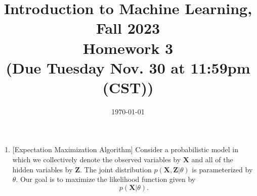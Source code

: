 \documentclass[10pt]{article}
\begin{document}
\date{\today}
\title{Introduction to Machine Learning, Fall 2023 \\
	Homework 3\\
	\small (Due Tuesday Nov. 30 at 11:59pm (CST))}
\maketitle

\begin{enumerate}[1.]


	\item {} [Expectation Maximization Algorithm]
            Consider a probabilistic model in which we collectively denote the observed variables by $\boldsymbol{X}$ and all of the hidden variables by $\boldsymbol{Z}$. The joint distribution $p(\boldsymbol{X},\boldsymbol{Z}|\theta)$ is parameterized by $\theta$. Our goal is to maximize the likelihood function given by
            \begin{equation}
                p(\boldsymbol{X}|\theta).
            \end{equation}
 

\end{enumerate}
\end{document}
